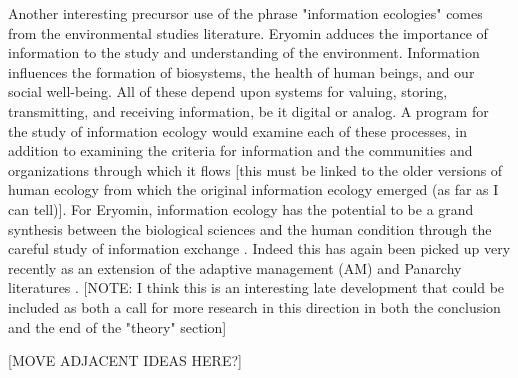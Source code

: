 Another interesting precursor use of the phrase "information ecologies" comes from the environmental studies literature. Eryomin adduces the importance of information to the study and understanding of the environment. Information influences the formation of biosystems, the health of human beings, and our social well-being. All of these depend upon systems for valuing, storing, transmitting, and receiving information, be it digital or analog. A program for the study of information ecology would examine each of these processes, in addition to examining the criteria for information and the communities and organizations through which it flows [this must be linked to the older versions of human ecology from which the original information ecology emerged (as far as I can tell)]. For Eryomin, information ecology has the potential to be a grand synthesis between the biological sciences and the human condition through the careful study of information exchange \citep{eryomin_information_1998}. Indeed this has again been picked up very recently as an extension of the adaptive management (AM) and Panarchy literatures \citep{eddy_information_2014}. [NOTE: I think this is an interesting late development that could be included as both a call for more research in this direction in both the conclusion and the end of the "theory" section]

[MOVE ADJACENT IDEAS HERE?]